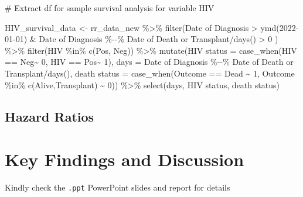 \documentclass[
  letterpaper,
  DIV=11,
  numbers=noendperiod]{scrartcl}
\newenvironment{Shaded}{\begin{snugshade}}{\end{snugshade}}
\newcommand{\AttributeTok}[1]{\textcolor[rgb]{0.40,0.45,0.13}{#1}}
\newcommand{\CommentTok}[1]{\textcolor[rgb]{0.37,0.37,0.37}{#1}}
\newcommand{\DecValTok}[1]{\textcolor[rgb]{0.68,0.00,0.00}{#1}}
\newcommand{\FunctionTok}[1]{\textcolor[rgb]{0.28,0.35,0.67}{#1}}
\newcommand{\NormalTok}[1]{\textcolor[rgb]{0.00,0.23,0.31}{#1}}
\newcommand{\OtherTok}[1]{\textcolor[rgb]{0.00,0.23,0.31}{#1}}
\newcommand{\SpecialCharTok}[1]{\textcolor[rgb]{0.37,0.37,0.37}{#1}}
\newcommand{\StringTok}[1]{\textcolor[rgb]{0.13,0.47,0.30}{#1}}
\begin{document}
\begin{Shaded}
\begin{Highlighting}[]
\CommentTok{\# Extract df for sample survival analysis for variable HIV}

\NormalTok{HIV\_survival\_data }\OtherTok{\textless{}{-}}\NormalTok{ rr\_data\_new }\SpecialCharTok{\%\textgreater{}\%}
  \FunctionTok{filter}\NormalTok{(}\StringTok{\textasciigrave{}}\AttributeTok{Date of Diagnosis}\StringTok{\textasciigrave{}} \SpecialCharTok{\textgreater{}} \FunctionTok{ymd}\NormalTok{(}\StringTok{\textquotesingle{}2022{-}01{-}01\textquotesingle{}}\NormalTok{) }\SpecialCharTok{\&}
           \StringTok{\textasciigrave{}}\AttributeTok{Date of Diagnosis}\StringTok{\textasciigrave{}} \SpecialCharTok{\%{-}{-}\%} \StringTok{\textasciigrave{}}\AttributeTok{Date of Death or Transplant}\StringTok{\textasciigrave{}}\SpecialCharTok{/}\FunctionTok{days}\NormalTok{() }\SpecialCharTok{\textgreater{}} \DecValTok{0}\NormalTok{ ) }\SpecialCharTok{\%\textgreater{}\%}
  \FunctionTok{filter}\NormalTok{(HIV }\SpecialCharTok{\%in\%} \FunctionTok{c}\NormalTok{(}\StringTok{\textquotesingle{}Pos\textquotesingle{}}\NormalTok{, }\StringTok{\textquotesingle{}Neg\textquotesingle{}}\NormalTok{)) }\SpecialCharTok{\%\textgreater{}\%} 
  \FunctionTok{mutate}\NormalTok{(}\StringTok{\textasciigrave{}}\AttributeTok{HIV status}\StringTok{\textasciigrave{}} \OtherTok{=} \FunctionTok{case\_when}\NormalTok{(HIV }\SpecialCharTok{==} \StringTok{\textquotesingle{}Neg\textquotesingle{}}\SpecialCharTok{\textasciitilde{}} \DecValTok{0}\NormalTok{,}
\NormalTok{                                    HIV }\SpecialCharTok{==} \StringTok{\textquotesingle{}Pos\textquotesingle{}}\SpecialCharTok{\textasciitilde{}} \DecValTok{1}\NormalTok{),}
           \AttributeTok{days =} \StringTok{\textasciigrave{}}\AttributeTok{Date of Diagnosis}\StringTok{\textasciigrave{}} \SpecialCharTok{\%{-}{-}\%} \StringTok{\textasciigrave{}}\AttributeTok{Date of Death or Transplant}\StringTok{\textasciigrave{}}\SpecialCharTok{/}\FunctionTok{days}\NormalTok{(),}
           \StringTok{\textasciigrave{}}\AttributeTok{death status}\StringTok{\textasciigrave{}} \OtherTok{=} \FunctionTok{case\_when}\NormalTok{(Outcome }\SpecialCharTok{==} \StringTok{\textquotesingle{}Dead\textquotesingle{}} \SpecialCharTok{\textasciitilde{}} \DecValTok{1}\NormalTok{,}
\NormalTok{                                      Outcome }\SpecialCharTok{\%in\%} \FunctionTok{c}\NormalTok{(}\StringTok{\textquotesingle{}Alive\textquotesingle{}}\NormalTok{,}\StringTok{\textquotesingle{}Transplant\textquotesingle{}}\NormalTok{) }\SpecialCharTok{\textasciitilde{}} \DecValTok{0}\NormalTok{)) }\SpecialCharTok{\%\textgreater{}\%} 
  \FunctionTok{select}\NormalTok{(days, }\StringTok{\textasciigrave{}}\AttributeTok{HIV status}\StringTok{\textasciigrave{}}\NormalTok{, }\StringTok{\textasciigrave{}}\AttributeTok{death status}\StringTok{\textasciigrave{}}\NormalTok{)}
\end{Highlighting}
\end{Shaded}

\subsection{Hazard Ratios}\label{hazard-ratios}

\section{Key Findings and Discussion}\label{key-findings-and-discussion}

Kindly check the \texttt{.ppt} PowerPoint slides and report for details
\end{document}
